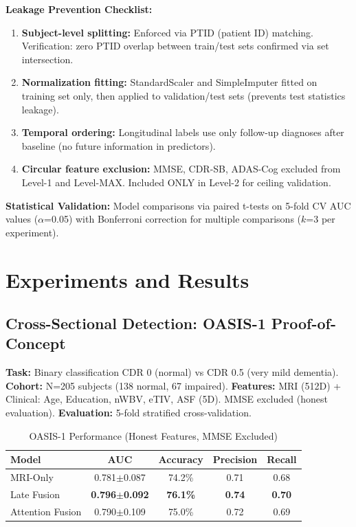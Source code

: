 \documentclass[conference]{IEEEtran}
\begin{document}
\textbf{Leakage Prevention Checklist:}
\begin{enumerate}
\item \textbf{Subject-level splitting:} Enforced via PTID (patient ID) matching. Verification: zero PTID overlap between train/test sets confirmed via set intersection.
\item \textbf{Normalization fitting:} StandardScaler and SimpleImputer fitted on training set only, then applied to validation/test sets (prevents test statistics leakage).
\item \textbf{Temporal ordering:} Longitudinal labels use only follow-up diagnoses after baseline (no future information in predictors).
\item \textbf{Circular feature exclusion:} MMSE, CDR-SB, ADAS-Cog excluded from Level-1 and Level-MAX. Included ONLY in Level-2 for ceiling validation.
\end{enumerate}

\textbf{Statistical Validation:} Model comparisons via paired t-tests on 5-fold CV AUC values ($\alpha$=0.05) with Bonferroni correction for multiple comparisons ($k$=3 per experiment).

\section{Experiments and Results}

\subsection{Cross-Sectional Detection: OASIS-1 Proof-of-Concept}

\textbf{Task:} Binary classification CDR 0 (normal) vs CDR 0.5 (very mild dementia).  
\textbf{Cohort:} N=205 subjects (138 normal, 67 impaired).  
\textbf{Features:} MRI (512D) + Clinical: Age, Education, nWBV, eTIV, ASF (5D). MMSE excluded (honest evaluation).  
\textbf{Evaluation:} 5-fold stratified cross-validation.

\begin{table}[h]
\centering
\caption{OASIS-1 Performance (Honest Features, MMSE Excluded)}
\label{tab:oasis}
\begin{tabular}{lcccc}
\toprule
\textbf{Model} & \textbf{AUC} & \textbf{Accuracy} & \textbf{Precision} & \textbf{Recall} \\
\midrule
MRI-Only & 0.781$\pm$0.087 & 74.2\% & 0.71 & 0.68 \\
Late Fusion & \textbf{0.796$\pm$0.092} & \textbf{76.1\%} & \textbf{0.74} & \textbf{0.70} \\
Attention Fusion & 0.790$\pm$0.109 & 75.0\% & 0.72 & 0.69 \\
\bottomrule
\end{tabular}
\end{table}
\end{document}
